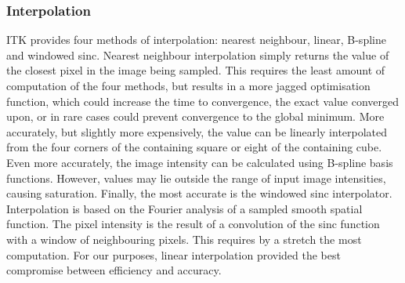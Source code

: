     \subsubsection{Interpolation} %
    \label{ssub:interpolation}
      ITK provides four methods of interpolation: nearest neighbour, linear, B-spline and windowed sinc. Nearest neighbour interpolation simply returns the value of the closest pixel in the image being sampled. This requires the least amount of computation of the four methods, but results in a more jagged optimisation function, which could increase the time to convergence, the exact value converged upon, or in rare cases could prevent convergence to the global minimum. More accurately, but slightly more expensively, the value can be linearly interpolated from the four corners of the containing square or eight of the containing cube. Even more accurately, the image intensity can be calculated using B-spline basis functions. However, values may lie outside the range of input image intensities, causing saturation. Finally, the most accurate is the windowed sinc interpolator. Interpolation is based on the Fourier analysis of a sampled smooth spatial function. The pixel intensity is the result of a convolution of the sinc function with a window of neighbouring pixels. This requires by a stretch the most computation. For our purposes, linear interpolation provided the best compromise between efficiency and accuracy.
    
